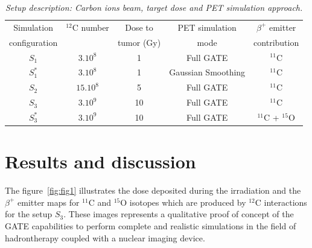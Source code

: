 \documentclass[11pt]{iopart}
\begin{document}
 
\begin{table}[htbp]
  \begin{center}
    \begin{tabular}{|c|c|c|c|c|} \hline
      Simulation   & $^{12}$C number  & Dose to   & PET simulation  & $\beta^{+}$ emitter  \\
      configuration               &                &  tumor (Gy)  & mode & contribution \\\hline \hline
      
      $S_{1}$    & $3.10^{8}$             & 1                     & Full GATE           &           $^{11}$C      \\ \hline
      $S_{1}^{*}$    & $3.10^{8}$         & 1                     & Gaussian Smoothing  &      $^{11}$C           \\ \hline
      $S_{2}$    & $15.10^{8}$            & 5                     & Full GATE           &       $^{11}$C          \\ \hline
      $S_{3}$    & $3.10^{9}$             & 10                    & Full GATE           &           $^{11}$C      \\ \hline
      $S_{3}^{*}$ & $3.10^{9}$            & 10                    & Full GATE           &  $^{11}$C + $^{15}$O    \\ \hline \hline 
    \end{tabular}
  \end{center} 
  \caption{\it Setup description: Carbon ions beam, target dose and PET simulation approach.}
  \label{tab:setup}
\end{table}

\section{Results and discussion}

The figure~\ref{fig:fig1} illustrates the dose deposited during the
irradiation and the $\beta^+$ emitter maps for $^{11}$C and $^{15}$O
isotopes which are produced by $^{12}$C interactions for the setup
$S_{3}$. These images represents a qualitative proof of concept of the
GATE capabilities to perform complete and realistic simulations in the
field of hadrontherapy coupled with a nuclear imaging device.
\end{document}
